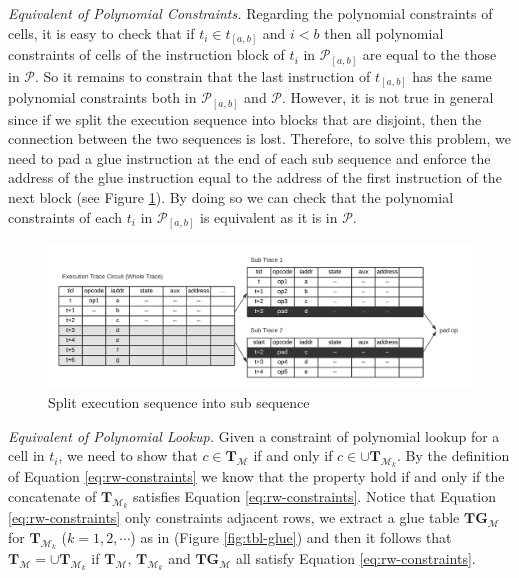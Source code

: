 \noindent\emph{Equivalent of Polynomial Constraints.} Regarding the polynomial constraints of cells, it is easy to check that if $t_i\in t_{[a,b]}$ and $i<b$ then all polynomial constraints of cells of the instruction block of $t_i$ in $\mathcal{P}_{[a,b]}$ are equal to the those in $\mathcal{P}$. So it remains to constrain that the last instruction of $t_{[a,b]}$ has the same polynomial constraints both in $\mathcal{P}_{[a,b]}$ and $\mathcal{P}$. However, it is not true in general since if we split the execution sequence into blocks that are disjoint, then the connection between the two sequences is lost. Therefore, to solve this problem, we need to pad a glue instruction at the end of each sub sequence and enforce the address of the glue instruction equal to the address of the first instruction of the next block (see Figure \ref{fig:subsequence}). By doing so we can check that the polynomial constraints of each $t_i$ in $\mathcal{P}_{[a,b]}$ is equivalent as it is in $\mathcal{P}$. \\

\begin{figure}[!ht]
\centerline{
\includegraphics[scale=0.6]{figs/subsequence.png}
}
\caption{Split execution sequence into sub sequence}
\label{fig:subsequence}
\end{figure}

\noindent\emph{Equivalent of Polynomial Lookup.} Given a constraint of polynomial lookup for a cell in $t_i$, we need to show that $c \in \mathbf{T}_\mathcal{M}$ if and only if $c \in \cup \mathbf{T}_{\mathcal{M}_{k}}$. By the definition of Equation \ref{eq:rw-constraints} we know that the property hold if and only if the concatenate of $\mathbf{T}_{\mathcal{M}_k}$ satisfies Equation \ref{eq:rw-constraints}. Notice that Equation \ref{eq:rw-constraints} only constraints adjacent rows, we extract a glue table $\mathbf{TG}_\mathcal{M}$ for $\mathbf{T}_{\mathcal{M}_{k}}$ ($k = 1,2,\cdots$) as in (Figure \ref{fig:tbl-glue}) and then it follows that $\mathbf{T}_\mathcal{M} = \cup \mathbf{T}_{\mathcal{M}_{k}}$ if $\mathbf{T}_\mathcal{M}$, $\mathbf{T}_{\mathcal{M}_{k}}$ and $\mathbf{TG}_\mathcal{M}$ all satisfy Equation \ref{eq:rw-constraints}.

